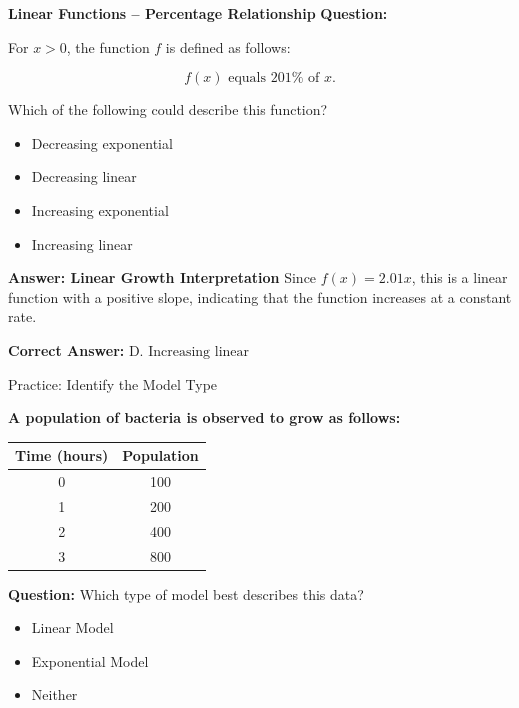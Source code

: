 \documentclass{beamer}
\begin{document}
\begin{frame}{\textbf{Linear Functions – Percentage Relationship}}
\textbf{Question:}

For \( x > 0 \), the function \( f \) is defined as follows:

\[
f(x) \text{ equals } 201\% \text{ of } x.
\]

Which of the following could describe this function?

\begin{itemize}
    \item [A] Decreasing exponential
    \item [B] Decreasing linear
    \item [C] Increasing exponential
    \item [D] Increasing linear
\end{itemize}
\end{frame}

\begin{frame}{\textbf{Answer: Linear Growth Interpretation}}
Since \( f(x) = 2.01x \), this is a linear function with a positive slope, indicating that the function increases at a constant rate.

\textbf{Correct Answer:} \( \boxed{\text{D. Increasing linear}} \)
\end{frame}

\begin{frame}{Practice: Identify the Model Type}
\small

\textbf{A population of bacteria is observed to grow as follows:}

\begin{center}
\begin{tabular}{|c|c|}
\hline
\textbf{Time (hours)} & \textbf{Population} \\
\hline
0 & 100 \\
1 & 200 \\
2 & 400 \\
3 & 800 \\
\hline
\end{tabular}
\end{center}

\vspace{0.2cm}
\textbf{Question:}  
Which type of model best describes this data?

\begin{itemize}
    \item[A.] Linear Model
    \item[B.] Exponential Model
    \item[C.] Neither
\end{itemize}

\end{frame}
\end{document}
